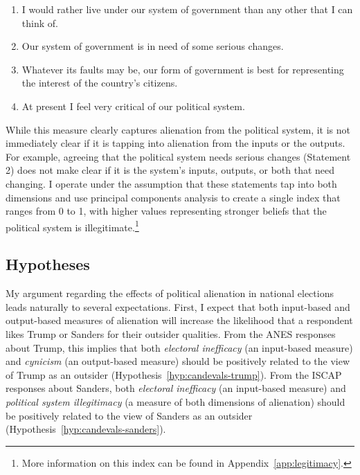 \documentclass[12pt]{article}
\begin{document}
\singlespacing
\begin{enumerate}
	\item I would rather live under our system of government than any other that I can think of.
	\item Our system of government is in need of some serious changes.
	\item Whatever its faults may be, our form of government is best for representing the interest of the country's citizens.
	\item At present I feel very critical of our political system.
\end{enumerate}
\doublespacing

While this measure clearly captures alienation from the political system, it is not immediately clear if it is tapping into alienation from the inputs or the outputs. For example, agreeing that the political system needs serious changes (Statement 2) does not make clear if it is the system's inputs, outputs, or both that need changing. I operate under the assumption that these statements tap into both dimensions and use principal components analysis to create a single index that ranges from 0 to 1, with higher values representing stronger beliefs that the political system is illegitimate.\footnote{More information on this index can be found in Appendix~\ref{app:legitimacy}.} 

\subsection{Hypotheses}
My argument regarding the effects of political alienation in national elections leads naturally to several expectations. First, I expect that both input-based and output-based measures of alienation will increase the likelihood that a respondent likes Trump or Sanders for their outsider qualities. From the ANES responses about Trump, this implies that both \textit{electoral inefficacy} (an input-based measure) and \textit{cynicism} (an output-based measure) should be positively related to the view of Trump as an outsider (Hypothesis~\ref{hyp:candevals-trump}). From the ISCAP responses about Sanders, both \textit{electoral inefficacy} (an input-based measure) and \textit{political system illegitimacy} (a measure of both dimensions of alienation) should be positively related to the view of Sanders as an outsider (Hypothesis~\ref{hyp:candevals-sanders}).

\end{document}
